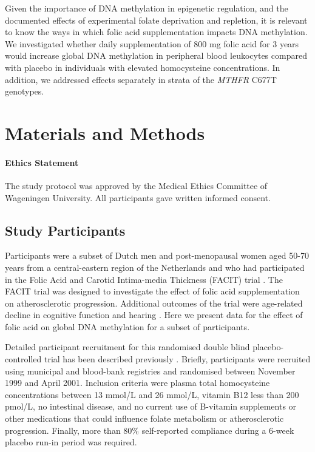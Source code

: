 \noindent Given the importance of DNA methylation in epigenetic regulation, and the documented effects of experimental folate deprivation and repletion, it is relevant to know the ways in which folic acid supplementation impacts DNA methylation. We investigated whether daily supplementation of 800 mg folic acid for 3 years would increase global DNA methylation in peripheral blood leukocytes compared with placebo in individuals with elevated homocysteine concentrations. In addition, we addressed effects separately in strata of the \emph{MTHFR} C677T genotypes.

\section[]{Materials and Methods} %

\paragraph*{Ethics Statement} 
The study protocol was approved by the Medical Ethics Committee of Wageningen University. All participants gave written informed consent.

\subsection{Study Participants} %
\noindent Participants were a subset of Dutch men and post-menopausal women aged 50-70 years from a central-eastern region of the Netherlands and who had participated in the Folic Acid and Carotid Intima-media Thickness (FACIT) trial \cite{c416}. The FACIT trial was designed to investigate the effect of folic acid supplementation on atherosclerotic progression. Additional outcomes of the trial were age-related decline in cognitive function and hearing \cite{c417,c418,c419}. Here we present data for the effect of folic acid on global DNA methylation for a subset of participants.

\noindent Detailed participant recruitment for this randomised double blind placebo-controlled trial has been described previously \cite{c417}. Briefly, participants were recruited using municipal and blood-bank registries and randomised between November 1999 and April 2001. Inclusion criteria were plasma total homocysteine concentrations between 13 mmol/L and 26 mmol/L, vitamin B12 less than 200 pmol/L, no intestinal disease, and no current use of B-vitamin supplements or other medications that could influence folate metabolism or atherosclerotic progression. Finally, more than 80\% self-reported compliance during a 6-week placebo run-in period was required.

